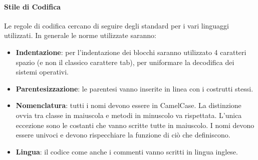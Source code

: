 \paragraph{Stile di Codifica}
Le regole di codifica cercano di seguire degli standard per i vari linguaggi utilizzati. In generale le norme utilizzate saranno:
\begin{itemize}
  \item \textbf{Indentazione}: per l'indentazione dei blocchi saranno utilizzato 4 caratteri spazio (e non il classico carattere tab), per uniformare la decodifica dei sistemi operativi.
  \item \textbf{Parentesizzazione}: le parentesi vanno inserite in linea con i costrutti stessi.
  \item \textbf{Nomenclatura}: tutti i nomi devono essere in CamelCase. La distinzione ovvia tra classe in maiuscola e metodi in minuscolo va rispettata. L'unica eccezione sono le costanti che vanno scritte tutte in maiuscolo. I nomi devono essere univoci e devono rispecchiare la funzione di ciò che definiscono.
  \item \textbf{Lingua}: il codice come anche i commenti vanno scritti in lingua inglese.
\end{itemize}
